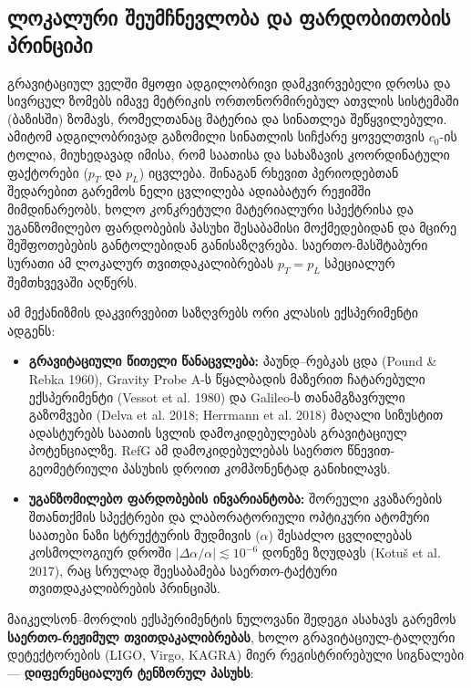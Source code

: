 \documentclass[11pt,a4paper]{article}
\begin{document}
\subsection{ლოკალური შეუმჩნევლობა და ფარდობითობის პრინციპი}

გრავიტაციულ ველში მყოფი ადგილობრივი დამკვირვებელი დროსა და სივრცულ ზომებს იმავე მეტრიკის ორთონორმირებულ ათვლის სისტემაში (ბაზისში) ზომავს, რომელთანაც მატერია და სინათლეა შეწყვილებული. ამიტომ ადგილობრივად გაზომილი სინათლის სიჩქარე ყოველთვის $c_0$-ის ტოლია, მიუხედავად იმისა, რომ საათისა და სახაზავის კოორდინატული ფაქტორები ($p_T$ და $p_L$) იცვლება. შინაგან რხევით პერიოდებთან შედარებით გარემოს ნელი ცვლილება ადიაბატურ რეჟიმში მიმდინარეობს, ხოლო კონკრეტული მატერიალური სპექტრისა და უგანზომილებო ფარდობების პასუხი შესაბამისი მოქმედებიდან და მცირე შეშფოთებების განტოლებიდან განისაზღვრება. საერთო-მასშტაბური სურათი ამ ლოკალურ თვითდაკალიბრებას $p_T=p_L$ სპეციალურ შემთხვევაში აღწერს.

ამ მექანიზმის დაკვირვებით საზღვრებს ორი კლასის ექსპერიმენტი ადგენს:

\begin{itemize}
\item \textbf{გრავიტაციული წითელი წანაცვლება:} პაუნდ–რებკას ცდა (Pound \& Rebka 1960), Gravity Probe A-ს წყალბადის მაზერით ჩატარებული ექსპერიმენტი (Vessot et al. 1980) და Galileo-ს თანამგზავრული გაზომვები (Delva et al. 2018; Herrmann et al. 2018) მაღალი სიზუსტით ადასტურებს საათის სვლის დამოკიდებულებას გრავიტაციულ პოტენციალზე. RefG ამ დამოკიდებულებას საერთო წნევით-გეომეტრიული პასუხის დროით კომპონენტად განიხილავს.
\item \textbf{უგანზომილებო ფარდობების ინვარიანტობა:} შორეული კვაზარების შთანთქმის სპექტრები და ლაბორატორიული ოპტიკური ატომური საათები ნაზი სტრუქტურის მუდმივის ($\alpha$) შესაძლო ცვლილებას კოსმოლოგიურ დროში $|\Delta\alpha/\alpha| \lesssim 10^{-6}$ დონეზე ზღუდავს (Kotuš et al. 2017), რაც სრულად შეესაბამება საერთო-ტაქტური თვითდაკალიბრების პრინციპს.

\end{itemize}
მაიკელსონ–მორლის ექსპერიმენტის ნულოვანი შედეგი ასახავს გარემოს \textbf{საერთო-რეჟიმულ თვითდაკალიბრებას}, ხოლო გრავიტაციულ-ტალღური დეტექტორების (LIGO, Virgo, KAGRA) მიერ რეგისტრირებული სიგნალები — \textbf{დიფერენციალურ ტენზორულ პასუხს}:
\end{document}
